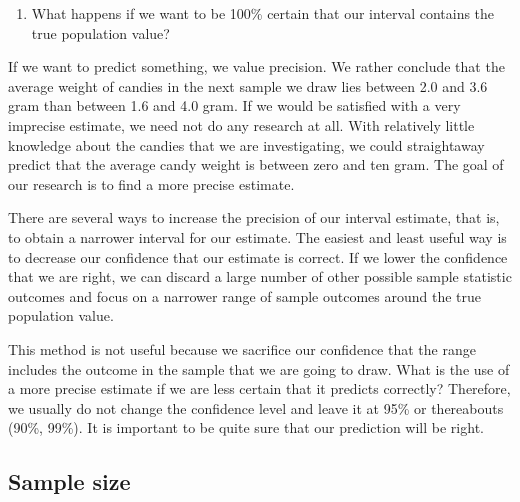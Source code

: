 \documentclass[a4paper]{book}
\newenvironment{Shaded}{\begin{snugshade}}{\end{snugshade}}
\newcommand{\DecValTok}[1]{\textcolor[rgb]{0.00,0.00,0.00}{#1}}
\newcommand{\StringTok}[1]{\textcolor[rgb]{0.00,0.00,0.00}{#1}}
\newcommand{\OperatorTok}[1]{\textcolor[rgb]{0.00,0.00,0.00}{\textbf{#1}}}
\newcommand{\NormalTok}[1]{#1}
\providecommand{\tightlist}{%
  \setlength{\itemsep}{0pt}\setlength{\parskip}{0pt}}
\theoremstyle{definition}
\theoremstyle{definition}
\theoremstyle{definition}
\theoremstyle{remark}
\begin{document}
\begin{enumerate}
\def\labelenumi{\arabic{enumi}.}
\setcounter{enumi}{1}
\tightlist
\item
  What happens if we want to be 100\% certain that our interval contains
  the true population value?
\end{enumerate}

\begin{Shaded}
\end{Shaded}

If we want to predict something, we value precision. We rather conclude
that the average weight of candies in the next sample we draw lies
between 2.0 and 3.6 gram than between 1.6 and 4.0 gram. If we would be
satisfied with a very imprecise estimate, we need not do any research at
all. With relatively little knowledge about the candies that we are
investigating, we could straightaway predict that the average candy
weight is between zero and ten gram. The goal of our research is to find
a more precise estimate.

There are several ways to increase the precision of our interval
estimate, that is, to obtain a narrower interval for our estimate. The
easiest and least useful way is to decrease our confidence that our
estimate is correct. If we lower the confidence that we are right, we
can discard a large number of other possible sample statistic outcomes
and focus on a narrower range of sample outcomes around the true
population value.

This method is not useful because we sacrifice our confidence that the
range includes the outcome in the sample that we are going to draw. What
is the use of a more precise estimate if we are less certain that it
predicts correctly? Therefore, we usually do not change the confidence
level and leave it at 95\% or thereabouts (90\%, 99\%). It is important
to be quite sure that our prediction will be right.

\subsection{Sample size}\label{sample-size}
\end{document}
